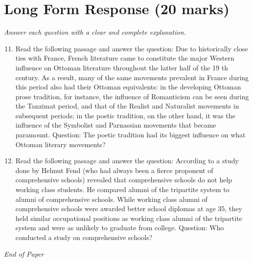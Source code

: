 \documentclass[12pt]{article}
\begin{document}
\section*{Long Form Response (20 marks)}
\textit{Answer each question with a clear and complete explanation.}
\begin{enumerate}[label=\arabic*.]
\setcounter{enumi}{10}
\item Read the following passage and answer the question: Due to historically close ties with France, French literature came to constitute the major Western influence on Ottoman literature throughout the latter half of the 19 th century. As a result, many of the same movements prevalent in France during this period also had their Ottoman equivalents: in the developing Ottoman prose tradition, for instance, the influence of Romanticism can be seen during the Tanzimat period, and that of the Realist and Naturalist movements in subsequent periods; in the poetic tradition, on the other hand, it was the influence of the Symbolist and Parnassian movements that became paramount. Question: The poetic tradition had its biggest influence on what Ottoman literary movements?
\item Read the following passage and answer the question: According to a study done by Helmut Fend (who had always been a fierce proponent of comprehensive schools) revealed that comprehensive schools do not help working class students. He compared alumni of the tripartite system to alumni of comprehensive schools. While working class alumni of comprehensive schools were awarded better school diplomas at age 35, they held similar occupational positions as working class alumni of the tripartite system and were as unlikely to graduate from college. Question: Who conducted a study on comprehensive schools?
\end{enumerate}

\vfill
\noindent\textit{End of Paper}
\end{document}
